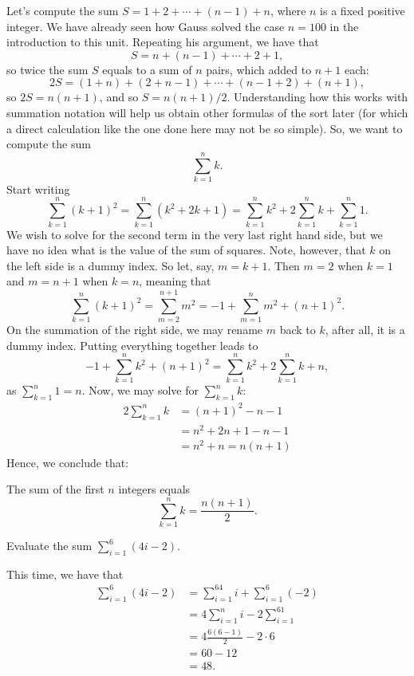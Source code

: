 \documentclass[nooutcomes]{ximera}
\begin{document}
Let's compute the sum $S = 1+2+\cdots +(n-1)+ n$, where $n$ is a fixed positive integer. We have already seen how Gauss solved the case $n=100$ in the introduction to this unit. Repeating his argument, we have that $$S = n + (n-1)+\cdots +2+1,$$so twice the sum $S$ equals to a sum of $n$ pairs, which added to $n+1$ each: $$2S = (1+n) + (2+n-1)+\cdots + (n-1+2) + (n+1),$$so $2S = n(n+1)$, and so $S = n(n+1)/2$. Understanding how this works with summation notation will help us obtain other formulas of the sort later (for which a direct calculation like the one done here may not be so simple). So, we want to compute the sum $$\sum_{k=1}^n k.$$Start writing$$\sum_{k=1}^n (k+1)^2 = \sum_{k=1}^n (k^2 + 2k+1) = \sum_{k=1}^n k^2 + 2\sum_{k=1}^n k + \sum_{k=1}^n 1.$$We wish to solve for the second term in the very last right hand side, but we have no idea what is the value of the sum of squares. Note, however, that $k$ on the left side is a dummy index. So let, say, $m=k+1$. Then $m=2$ when $k=1$ and $m=n+1$ when $k=n$, meaning that $$\sum_{k=1}^n(k+1)^2 = \sum_{m=2}^{n+1} m^2 = -1 + \sum_{m=1}^n m^2 + (n+1)^2.$$On the summation of the right side, we may rename $m$ back to $k$, after all, it is a dummy index. Putting everything together leads to $$-1+\sum_{k=1}^nk^2+(n+1)^2 = \sum_{k=1}^n k^2+2\sum_{k=1}^nk+n,$$as $\sum_{k=1}^n 1=n$. Now, we may solve for $\sum_{k=1}^nk$:
\begin{align*} 2\sum_{k=1}^nk &= (n+1)^2-n-1 \\ &= n^2+2n+1-n-1 \\ &= n^2+n =n(n+1)\end{align*}Hence, we conclude that:
\begin{callout}
The sum of the first $n$ integers equals $$\sum_{k=1}^n k = \frac{n(n+1)}{2}.$$  
\end{callout}

\begin{example}
  Evaluate the sum $\sum_{i=1}^6 (4i-2)$.

  \begin{explanation}
  This time, we have that
  \begin{align*}
    \sum_{i=1}^6 (4i-2) &= \sum_{i=1}^64i + \sum_{i=1}^6(-2) \\ &= 4\sum_{i=1}^ni - 2\sum_{i=1}^61 \\ &= 4\frac{6(6-1)}{2} - 2\cdot 6 \\ &= 60-12 \\ &= 48.
  \end{align*}
  \end{explanation}
\end{example}
\end{document}
